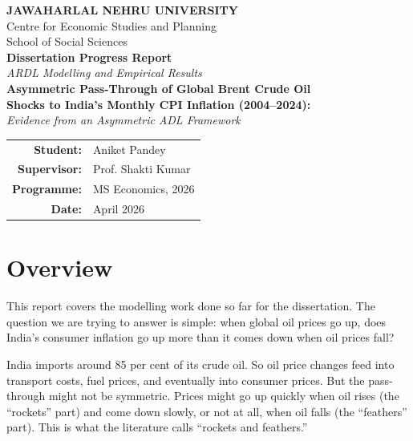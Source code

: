 \documentclass[12pt,a4paper]{article}
\begin{document}
\begin{titlepage}
\centering
\vspace*{2cm}

{\Large \textbf{JAWAHARLAL NEHRU UNIVERSITY}}\\[0.3cm]
{\large Centre for Economic Studies and Planning}\\[0.3cm]
{\large School of Social Sciences}\\[2.5cm]

{\LARGE \textbf{Dissertation Progress Report}}\\[0.4cm]
{\Large \textit{ARDL Modelling and Empirical Results}}\\[1.8cm]

{\Large \textbf{Asymmetric Pass-Through of Global Brent Crude Oil\\[0.2cm]
Shocks to India's Monthly CPI Inflation (2004--2024):}\\[0.2cm]
\textit{Evidence from an Asymmetric ADL Framework}}\\[2.5cm]

\begin{tabular}{rl}
\textbf{Student:}    & Aniket Pandey \\[0.3cm]
\textbf{Supervisor:} & Prof. Shakti Kumar \\[0.3cm]
\textbf{Programme:}  & MS Economics, 2026 \\[0.3cm]
\textbf{Date:}       & April 2026 \\
\end{tabular}

\vfill
\end{titlepage}

\newpage
\tableofcontents
\newpage


\section{Overview}

This report covers the modelling work done so far for the dissertation. The question we are trying to answer is simple: when global oil prices go up, does India's consumer inflation go up more than it comes down when oil prices fall?

India imports around 85 per cent of its crude oil. So oil price changes feed into transport costs, fuel prices, and eventually into consumer prices. But the pass-through might not be symmetric. Prices might go up quickly when oil rises (the ``rockets'' part) and come down slowly, or not at all, when oil falls (the ``feathers'' part). This is what the literature calls ``rockets and feathers.''
\end{document}
